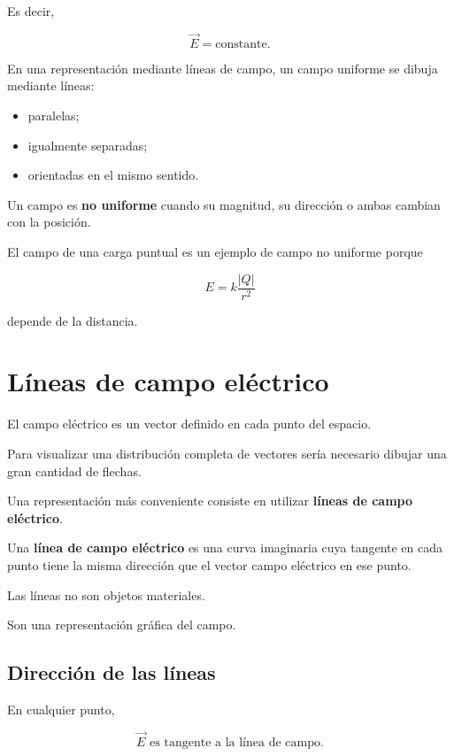 Es decir,

\[
\boxed{\vec E=\text{constante}}.
\]

En una representación mediante líneas de campo, un campo uniforme se dibuja mediante
líneas:

\begin{itemize}
    \item paralelas;
    \item igualmente separadas;
    \item orientadas en el mismo sentido.
\end{itemize}

Un campo es \textbf{no uniforme} cuando su magnitud, su dirección o ambas cambian con
la posición.

El campo de una carga puntual es un ejemplo de campo no uniforme porque

\[
E=k\frac{|Q|}{r^2}
\]

depende de la distancia.


\section{Líneas de campo eléctrico}

El campo eléctrico es un vector definido en cada punto del espacio.

Para visualizar una distribución completa de vectores sería necesario dibujar una
gran cantidad de flechas.

Una representación más conveniente consiste en utilizar
\textbf{líneas de campo eléctrico}.

\begin{definicion}

Una \textbf{línea de campo eléctrico} es una curva imaginaria cuya tangente en cada
punto tiene la misma dirección que el vector campo eléctrico en ese punto.

\end{definicion}

Las líneas no son objetos materiales.

Son una representación gráfica del campo.


\subsection{Dirección de las líneas}

En cualquier punto,

\[
\boxed{
\vec E
\text{ es tangente a la línea de campo}
}.
\]

